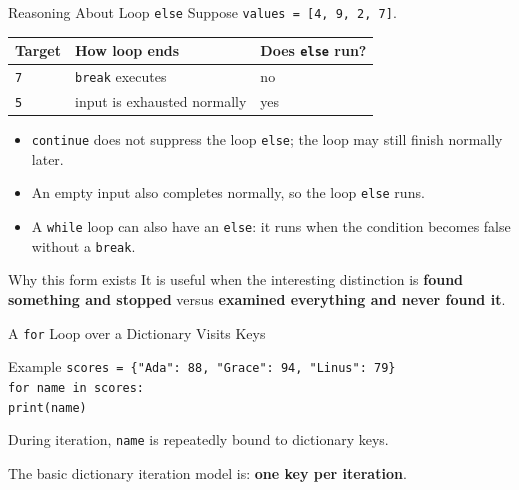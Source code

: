 \documentclass[aspectratio=169,10pt]{beamer}
\begin{document}
\begin{frame}{Reasoning About Loop \texttt{else}}
  Suppose \texttt{values = [4, 9, 2, 7]}.

  \begin{center}
    \renewcommand{\arraystretch}{1.28}
    \begin{tabular}{l|l|l}
      \textbf{Target} & \textbf{How loop ends} & \textbf{Does \texttt{else} run?} \\\hline
      \texttt{7} & \texttt{break} executes & no \\
      \texttt{5} & input is exhausted normally & yes
    \end{tabular}
  \end{center}

  \begin{itemize}
    \item \texttt{continue} does not suppress the loop \texttt{else}; the loop may still finish normally later.
    \item An empty input also completes normally, so the loop \texttt{else} runs.
    \item A \texttt{while} loop can also have an \texttt{else}: it runs when the condition becomes false without a \texttt{break}.
  \end{itemize}

  \begin{alertblock}{Why this form exists}
    It is useful when the interesting distinction is \textbf{found something and stopped} versus \textbf{examined everything and never found it}.
  \end{alertblock}
\end{frame}


\begin{frame}{A \texttt{for} Loop over a Dictionary Visits Keys}
  \begin{block}{Example}
    \texttt{scores = \{"Ada": 88, "Grace": 94, "Linus": 79\}}\\[0.08in]
    \texttt{for name in scores:}\\
    \hspace{0.20in}\texttt{print(name)}
  \end{block}

  During iteration, \texttt{name} is repeatedly bound to dictionary keys.

  \begin{keyidea}
    The basic dictionary iteration model is: \textbf{one key per iteration}.
  \end{keyidea}
\end{frame}
\end{document}
